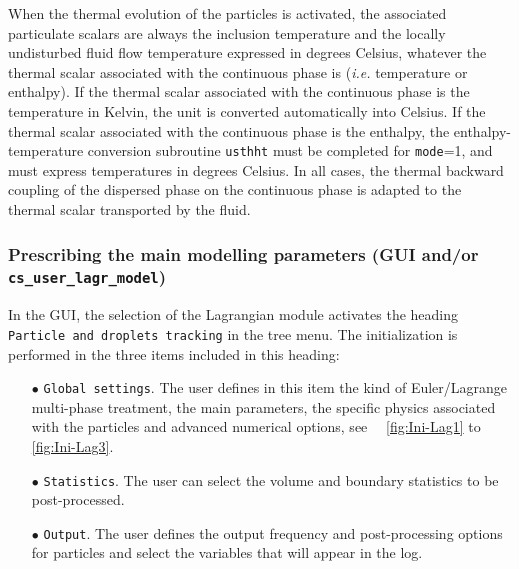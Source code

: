 {{{When the thermal evolution of the particles is activated, the associated particulate scalars are always the inclusion temperature and the locally undisturbed fluid flow temperature expressed in degrees Celsius, whatever the thermal scalar associated with the continuous phase is ({\em i.e.} temperature or enthalpy). If the
thermal scalar associated with the continuous phase is the temperature in Kelvin, the unit is converted automatically into Celsius. If the thermal scalar associated with the continuous phase is the enthalpy, the enthalpy-temperature conversion subroutine \texttt{usthht} must be completed for \texttt{mode}=1, and must express temperatures in degrees Celsius. In all cases, the thermal backward coupling of the dispersed phase on the continuous phase is adapted to the thermal scalar transported by the fluid.


\subsubsection{Prescribing the main modelling parameters (GUI and/or \texttt{cs\_user\_lagr\_model})}\label{sec:Ini-lag}


In the GUI, the selection of the Lagrangian module activates the heading \texttt{Particle and droplets tracking} in the tree menu. The initialization is performed in the three items included in this heading:
%
\begin{itemize}
 \item [$\bullet$] \texttt{Global settings}. The user defines in this item the kind of Euler/Lagrange multi-phase treatment, the main parameters, the specific physics associated with the particles and advanced numerical options, see ~\figurename~\ref {fig:Ini-Lag1} to \figurename\ref {fig:Ini-Lag3}.
 \item [$\bullet$] \texttt{Statistics}. The user can select the volume and boundary statistics to be post-processed.
 \item [$\bullet$] \texttt{Output}. The user defines the output frequency and post-processing options for particles and select the variables that will appear in the log.
\end{itemize}

}}}

